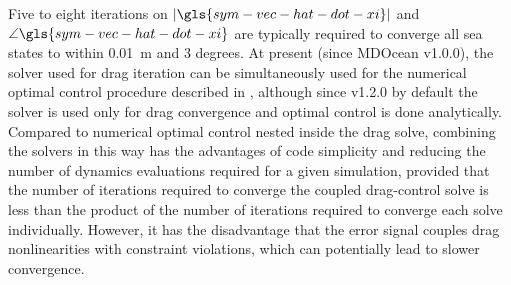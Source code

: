 \documentclass[a4paper,fleqn,colorlinks,unicode,lineno]{cas-dc} %
\begin{document}
Five to eight iterations on $|\gls{sym-vec-hat-dot-xi}|$ and $\angle \gls{sym-vec-hat-dot-xi}$  are typically required to converge all sea states to within 0.01~m and 3 degrees. %
At present (since MDOcean v1.0.0), the solver used for drag iteration can be simultaneously used for the numerical optimal control procedure described in , although since v1.2.0 by default the solver is used only for drag convergence and optimal control is done analytically.
Compared to numerical optimal control nested inside the drag solve, combining the solvers in this way has the advantages of code simplicity and reducing the number of dynamics evaluations required for a given simulation, provided that the number of iterations required to converge the coupled drag-control solve is less than the product of the number of iterations required to converge each solve individually.
However, it has the disadvantage that the error signal couples drag nonlinearities with constraint violations, which can potentially lead to slower convergence.

\end{document}
